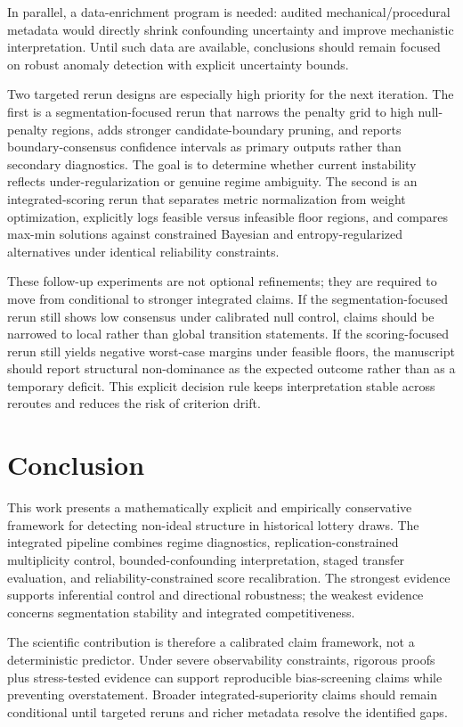 \documentclass{article} %
\begin{document}
In parallel, a data-enrichment program is needed: audited mechanical/procedural metadata would directly shrink confounding uncertainty and improve mechanistic interpretation. Until such data are available, conclusions should remain focused on robust anomaly detection with explicit uncertainty bounds.

Two targeted rerun designs are especially high priority for the next iteration. The first is a segmentation-focused rerun that narrows the penalty grid to high null-penalty regions, adds stronger candidate-boundary pruning, and reports boundary-consensus confidence intervals as primary outputs rather than secondary diagnostics. The goal is to determine whether current instability reflects under-regularization or genuine regime ambiguity. The second is an integrated-scoring rerun that separates metric normalization from weight optimization, explicitly logs feasible versus infeasible floor regions, and compares max-min solutions against constrained Bayesian and entropy-regularized alternatives under identical reliability constraints.

These follow-up experiments are not optional refinements; they are required to move from conditional to stronger integrated claims. If the segmentation-focused rerun still shows low consensus under calibrated null control, claims should be narrowed to local rather than global transition statements. If the scoring-focused rerun still yields negative worst-case margins under feasible floors, the manuscript should report structural non-dominance as the expected outcome rather than as a temporary deficit. This explicit decision rule keeps interpretation stable across reroutes and reduces the risk of criterion drift.

\section{Conclusion}\label{sec:conclusion}
This work presents a mathematically explicit and empirically conservative framework for detecting non-ideal structure in historical lottery draws. The integrated pipeline combines regime diagnostics, replication-constrained multiplicity control, bounded-confounding interpretation, staged transfer evaluation, and reliability-constrained score recalibration. The strongest evidence supports inferential control and directional robustness; the weakest evidence concerns segmentation stability and integrated competitiveness.

The scientific contribution is therefore a calibrated claim framework, not a deterministic predictor. Under severe observability constraints, rigorous proofs plus stress-tested evidence can support reproducible bias-screening claims while preventing overstatement. Broader integrated-superiority claims should remain conditional until targeted reruns and richer metadata resolve the identified gaps.
\end{document}

